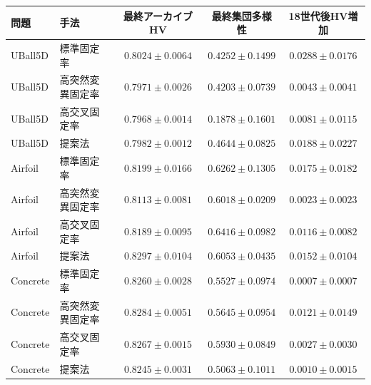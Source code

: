 \begin{tabular}{@{}llccc@{}}
\toprule
問題 & 手法 & 最終アーカイブHV & 最終集団多様性 & 18世代後HV増加 \\
\midrule
UBall5D & 標準固定率 & \(0.8024\pm0.0064\) & \(0.4252\pm0.1499\) & \(0.0288\pm0.0176\) \\
UBall5D & 高突然変異固定率 & \(0.7971\pm0.0026\) & \(0.4203\pm0.0739\) & \(0.0043\pm0.0041\) \\
UBall5D & 高交叉固定率 & \(0.7968\pm0.0014\) & \(0.1878\pm0.1601\) & \(0.0081\pm0.0115\) \\
UBall5D & 提案法 & \(0.7982\pm0.0012\) & \(0.4644\pm0.0825\) & \(0.0188\pm0.0227\) \\
\addlinespace[2pt]
Airfoil & 標準固定率 & \(0.8199\pm0.0166\) & \(0.6262\pm0.1305\) & \(0.0175\pm0.0182\) \\
Airfoil & 高突然変異固定率 & \(0.8113\pm0.0081\) & \(0.6018\pm0.0209\) & \(0.0023\pm0.0023\) \\
Airfoil & 高交叉固定率 & \(0.8189\pm0.0095\) & \(0.6416\pm0.0982\) & \(0.0116\pm0.0082\) \\
Airfoil & 提案法 & \(0.8297\pm0.0104\) & \(0.6053\pm0.0435\) & \(0.0152\pm0.0104\) \\
\addlinespace[2pt]
Concrete & 標準固定率 & \(0.8260\pm0.0028\) & \(0.5527\pm0.0974\) & \(0.0007\pm0.0007\) \\
Concrete & 高突然変異固定率 & \(0.8284\pm0.0051\) & \(0.5645\pm0.0954\) & \(0.0121\pm0.0149\) \\
Concrete & 高交叉固定率 & \(0.8267\pm0.0015\) & \(0.5930\pm0.0849\) & \(0.0027\pm0.0030\) \\
Concrete & 提案法 & \(0.8245\pm0.0031\) & \(0.5063\pm0.1011\) & \(0.0010\pm0.0015\) \\
\bottomrule
\end{tabular}

